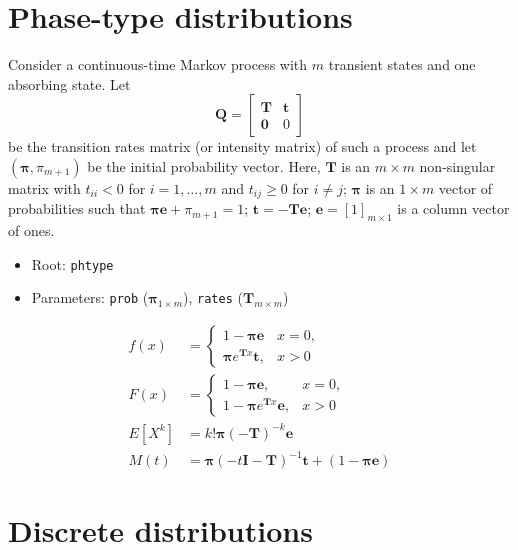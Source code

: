 \documentclass[x11names]{article}
\newcommand{\E}[1]{E[ #1 ]}
\newcommand{\mat}[1]{\mathbold{#1}} %
\newcommand{\code}[1]{\texttt{#1}}
\begin{document}
\section{Phase-type distributions}
\label{sec:app:phase-type}

Consider a continuous-time Markov process with $m$ transient
states and one absorbing state. Let
\begin{equation}
  \label{eq:Markov-transition-matrix}
  \mat{Q} =
  \begin{bmatrix}
    \mat{T} & \mat{t} \\
    \mat{0} & 0
  \end{bmatrix}
\end{equation}
be the transition rates matrix (or intensity matrix) of such a process
and let $(\mat{\pi}, \pi_{m + 1})$ be the initial probability vector.
Here, $\mat{T}$ is an $m \times m$ non-singular matrix with
$t_{ii} < 0$ for $i = 1, \dots, m$ and $t_{ij} \geq 0$ for $i \neq j$;
$\mat{\pi}$ is an $1 \times m$ vector of probabilities such that
$\mat{\pi} \mat{e} + \pi_{m + 1} = 1$; $\mat{t} = -\mat{T} \mat{e}$;
$\mat{e} = [1]_{m \times 1}$ is a column vector of ones. %
\bigskip

\begin{itemize}
\item Root: \code{phtype}
\item Parameters: \code{prob} ($\mat{\pi}_{1 \times m}$),
    \code{rates} ($\mat{T}_{m \times m}$)
\end{itemize}

\begin{align*}
  f(x)
  &=
    \begin{cases}
      1 - \mat{\pi} \mat{e} & x = 0, \\
      \mat{\pi} e^{\mat{T} x} \mat{t}, & x > 0
    \end{cases} \\
  F(x)
  &=
    \begin{cases}
      1 - \mat{\pi} \mat{e}, & x = 0, \\
      1 - \mat{\pi} e^{\mat{T} x} \mat{e}, & x > 0
    \end{cases} \\
  \E{X^k}
  &= k! \mat{\pi} (-\mat{T})^{-k} \mat{e} \\
  M(t)
  &= \mat{\pi} (-t \mat{I} - \mat{T})^{-1} \mat{t}
    + (1 - \mat{\pi} \mat{e})
\end{align*}


\section{Discrete distributions}
\label{sec:app:discrete}
\end{document}
